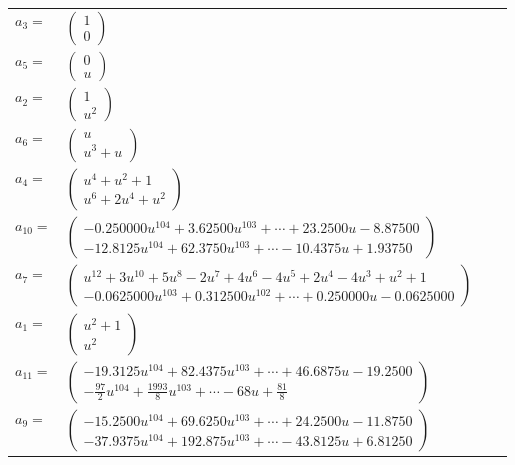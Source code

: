 \documentclass[1p]{elsarticle_modified}
\theoremstyle{definition}
\begin{document}
\begin{tabular}{m{7pt} m{180pt} m{7pt} m{180pt} }
\flushright $a_{3}=$&$\begin{pmatrix}1\\0\end{pmatrix}$ \\
\flushright $a_{5}=$&$\begin{pmatrix}0\\u\end{pmatrix}$ \\
\flushright $a_{2}=$&$\begin{pmatrix}1\\u^2\end{pmatrix}$ \\
\flushright $a_{6}=$&$\begin{pmatrix}u\\u^3+u\end{pmatrix}$ \\
\flushright $a_{4}=$&$\begin{pmatrix}u^4+u^2+1\\u^6+2 u^4+u^2\end{pmatrix}$ \\
\flushright $a_{10}=$&$\begin{pmatrix}-0.250000 u^{104}+3.62500 u^{103}+\cdots+23.2500 u-8.87500\\-12.8125 u^{104}+62.3750 u^{103}+\cdots-10.4375 u+1.93750\end{pmatrix}$ \\
\flushright $a_{7}=$&$\begin{pmatrix}u^{12}+3 u^{10}+5 u^8-2 u^7+4 u^6-4 u^5+2 u^4-4 u^3+u^2+1\\-0.0625000 u^{103}+0.312500 u^{102}+\cdots+0.250000 u-0.0625000\end{pmatrix}$ \\
\flushright $a_{1}=$&$\begin{pmatrix}u^2+1\\u^2\end{pmatrix}$ \\
\flushright $a_{11}=$&$\begin{pmatrix}-19.3125 u^{104}+82.4375 u^{103}+\cdots+46.6875 u-19.2500\\-\frac{97}{2} u^{104}+\frac{1993}{8} u^{103}+\cdots-68 u+\frac{81}{8}\end{pmatrix}$ \\
\flushright $a_{9}=$&$\begin{pmatrix}-15.2500 u^{104}+69.6250 u^{103}+\cdots+24.2500 u-11.8750\\-37.9375 u^{104}+192.875 u^{103}+\cdots-43.8125 u+6.81250\end{pmatrix}$ \\

\end{tabular}
\end{document}
